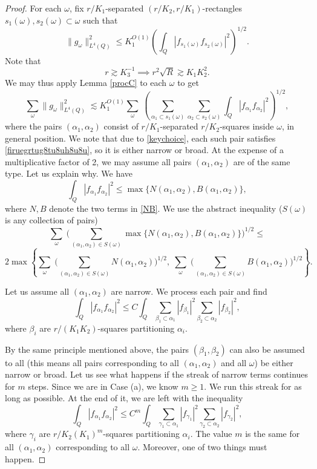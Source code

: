 \documentclass{amsart}%
\numberwithin{equation}{section}
\newcommand{\1}{\mathbbm{1}}
\begin{document}
	\begin{proof}
		For each $\omega$, fix $r/K_1$-separated $(r/K_2,r/K_1)$-rectangles $s_1(\omega),s_2(\omega)\subset\omega$ such that
		$$\|g_\omega\|_{L^4(Q)}^2\le K_1^{O(1)}(\int_Q|f_{s_1(\omega)}f_{s_2(\omega)}|^2)^{1/2}.$$
		Note that 
		\begin{equation}
		\label{keychoice}
		r\gtrsim K_3^{-1}\implies r^2\sqrt{R}\gtrsim K_1K_2^2.
	\end{equation}
		We may thus apply Lemma \ref{procC}	to each $\omega$ to get
		\begin{equation}
			\label{dhdgfgjhuh1}
			\sum_{\omega}\|g_\omega\|_{L^4(Q)}^2\lesssim K_1^{O(1)}\sum_{\omega}\; (\sum_{\alpha_1\subset s_1(\omega)}\sum_{\alpha_2\subset s_2(\omega)}\int_{Q}|f_{\alpha_1}f_{\alpha_2}|^2)^{1/2},
		\end{equation}
		where the pairs $(\alpha_1,\alpha_2)$ consist of $r/K_1$-separated $r/K_2$-squares inside $\omega$, in general position.
		We note that due to \eqref{keychoice}, each such pair satisfies \eqref{firuegrtug8tu8uh8u8u}, so it is either narrow or broad. At the expense of a multiplicative  factor of 2,  we may assume all pairs $(\alpha_1,\alpha_2)$ are of the same type. Let us explain why. We have
		$$\int_{Q}|f_{\alpha_1}f_{\alpha_2}|^2\le \max\{N(\alpha_1,\alpha_2),B(\alpha_1,\alpha_2)\},$$
		where $N, B$ denote the two terms in \eqref{NB}. We use the abstract inequality ($S(\omega)$ is any collection of pairs)
		$$\sum_{\omega}\;\big(\sum_{(\alpha_1,\alpha_2)\in S(\omega)}\max\{N(\alpha_1,\alpha_2),B(\alpha_1,\alpha_2)\}\big)^{1/2}\le $$
		\begin{equation}
		\label{factor2}
		2\max\left \{\sum_{\omega}\;\big(\sum_{(\alpha_1,\alpha_2)\in S(\omega)}N(\alpha_1,\alpha_2)\big)^{1/2},\;\sum_{\omega}\; \big(\sum_{(\alpha_1,\alpha_2)\in S(\omega)}B(\alpha_1,\alpha_2)\big)^{1/2}\right\}.
		\end{equation}
	\medskip
    
	     Let us assume all $(\alpha_1,\alpha_2)$ are narrow. We process each pair  and find 
		$$\int_{Q}|f_{\alpha_1}f_{\alpha_2}|^2\le C \int_{Q}\sum_{\beta_1\subset \alpha_1}|f_{\beta_1}|^2\sum_{\beta_2\subset \alpha_2}|f_{\beta_2}|^2,
		$$
		where $\beta_i$ are  $r/(K_1K_2)$-squares partitioning $\alpha_i$.
		
		By the same principle mentioned above, the pairs $(\beta_1,\beta_2)$ can also be assumed to all (this means all pairs corresponding to all $(\alpha_1,\alpha_2)$ and all $\omega$) be either narrow or broad. Let us see what happens if the streak of narrow terms continues for $m$ steps. 
        Since we are in Case (a), we know $m\ge 1$. 
        We run this streak for as long as possible. 
        At the end of it, we are left with the inequality
		\begin{equation}
			\label{dhdgfgjhuh2}\int_{Q}|f_{\alpha_1}f_{\alpha_2}|^2\le C^{m} \int_{Q}\sum_{\gamma_1\subset \alpha_1}|f_{\gamma_1}|^2\sum_{\gamma_2\subset \alpha_2}|f_{\gamma_2}|^2,
		\end{equation}
		where $\gamma_i$ are $r/K_2(K_1)^m$-squares partitioning $\alpha_i$.	The value $m$ is the same for all $(\alpha_1,\alpha_2)$ corresponding to all $\omega$. Moreover, one of two things must happen.
	\medskip
		

\end{proof}
\end{document}
